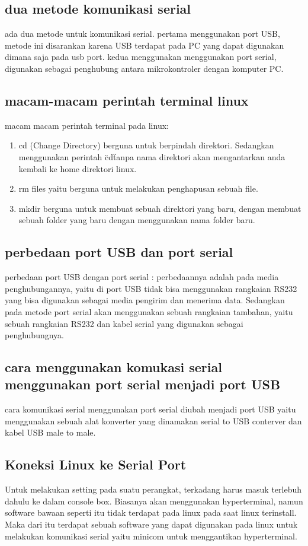 	\subsection{dua metode komunikasi serial}
	ada dua metode untuk komunikasi serial.
	pertama menggunakan port USB, metode ini disarankan karena USB terdapat pada PC yang dapat digunakan dimana saja pada usb port.
	kedua menggunakan menggunakan port serial, digunakan sebagai penghubung antara mikrokontroler dengan komputer PC.
	
	\subsection{macam-macam perintah terminal linux}
	macam macam perintah terminal pada linux:
		\begin{enumerate}
			\item cd (Change Directory) berguna untuk berpindah direktori. Sedangkan menggunakan perintah \"cd\" tanpa nama direktori akan mengantarkan anda kembali ke home direktori linux.
			\item rm files yaitu berguna untuk melakukan penghapusan sebuah file.
			\item mkdir berguna untuk membuat sebuah direktori yang baru, dengan membuat sebuah folder yang baru dengan menggunakan nama folder baru.
		\end{enumerate}
		
	\subsection{perbedaan port USB dan port serial}
	perbedaan port USB dengan port serial :
	perbedaannya adalah pada media penghubungannya, yaitu di port USB tidak bisa menggunakan rangkaian RS232 yang bisa digunakan sebagai media pengirim dan menerima data. Sedangkan pada metode port serial akan menggunakan sebuah rangkaian tambahan, yaitu sebuah rangkaian RS232 dan kabel serial yang digunakan sebagai penghubungnya.
	
	\subsection{cara menggunakan komukasi serial menggunakan port serial menjadi port USB}
	cara komunikasi serial menggunakan port serial diubah menjadi port USB yaitu menggunakan sebuah alat konverter yang dinamakan serial to USB conterver
	dan kabel USB male to male.
	
	\subsection{Koneksi Linux ke Serial Port}
	Untuk melakukan setting pada suatu perangkat, terkadang harus masuk terlebuh dahulu ke dalam console box. Biasanya akan menggunakan hyperterminal, namun software bawaan seperti itu tidak terdapat pada linux pada saat linux terinstall. Maka dari itu terdapat sebuah software yang dapat digunakan pada linux untuk melakukan komunikasi serial yaitu minicom untuk menggantikan hyperterminal.
	
